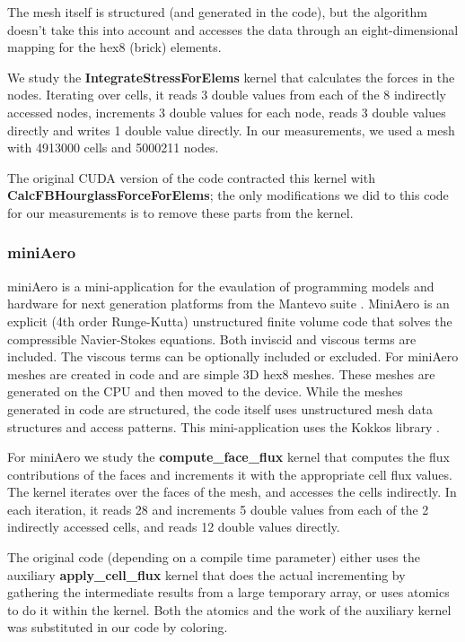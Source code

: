 The mesh itself is structured (and generated in the code), but
the algorithm doesn't take this into account and accesses the data through an
eight-dimensional mapping for the hex8 (brick) elements.

We study the \textbf{IntegrateStressForElems} kernel that calculates the
forces in the nodes. Iterating over cells, it reads 3 double values
from each of the 8 indirectly accessed nodes, increments 3 double values for
each node, reads 3 double values directly and writes 1 double value directly. In
our measurements, we used a mesh with \num{4913000} cells and \num{5000211}
nodes.

The original CUDA version of the code contracted this kernel with
\textbf{CalcFBHourglassForceForElems}; the only modifications we did to this
code for our measurements is to remove these parts from the kernel.

\subsubsection{miniAero}\label{sec:mini-aero-summary}

miniAero \cite{miniaero} is a mini-application for the evaulation of programming
models and hardware for next generation platforms from the Mantevo suite
\cite{heroux2009improving}. MiniAero is an explicit (4th order
Runge-Kutta) unstructured finite volume code that solves the compressible
Navier-Stokes equations. Both inviscid and viscous terms are included. The
viscous terms can be optionally included or excluded. For miniAero meshes are
created in code and are simple 3D hex8 meshes. These meshes are generated on the
CPU and then moved to the device. While the meshes generated in code are
structured, the code itself uses unstructured mesh data structures and access
patterns. This mini-application uses the Kokkos library
\cite{CarterEdwards20143202}.

For miniAero we study the \textbf{compute\_face\_flux} kernel that computes the
flux contributions of the faces and increments it with the appropriate cell flux
values. The kernel iterates over the faces of the mesh, and accesses the cells
indirectly. In each iteration, it reads 28 and increments 5 double values from
each of the 2 indirectly accessed cells, and reads 12 double values directly.

The original code (depending on a compile time parameter) either uses the
auxiliary \textbf{apply\_cell\_flux} kernel that does the actual incrementing by
gathering the intermediate results from a large temporary array, or uses atomics
to do it within the kernel. Both the atomics and the work of the auxiliary
kernel was substituted in our code by coloring.

